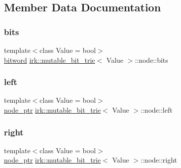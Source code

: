 \subsection{Member Data Documentation}
\mbox{\label{structirk_1_1mutable__bit__trie_1_1node_a8b55d968fa4274a91a6395ea1b9785a8}} 
\subsubsection{\texorpdfstring{bits}{bits}}
{\footnotesize\ttfamily template$<$class Value = bool$>$ \\
\mbox{\hyperlink{namespaceirk_a979e09720c2ef05573819388a3c0e79a}{bitword}} \mbox{\hyperlink{classirk_1_1mutable__bit__trie}{irk\+::mutable\+\_\+bit\+\_\+trie}}$<$ Value $>$\+::node\+::bits}

\mbox{\label{structirk_1_1mutable__bit__trie_1_1node_af59565476fb0ce3e3e3d57edbd8ca1de}} 
\subsubsection{\texorpdfstring{left}{left}}
{\footnotesize\ttfamily template$<$class Value = bool$>$ \\
\mbox{\hyperlink{classirk_1_1mutable__bit__trie_abd23179ac4f02a981d4f47b4c0652287}{node\+\_\+ptr}} \mbox{\hyperlink{classirk_1_1mutable__bit__trie}{irk\+::mutable\+\_\+bit\+\_\+trie}}$<$ Value $>$\+::node\+::left}

\mbox{\label{structirk_1_1mutable__bit__trie_1_1node_ad75512c087c6adaf342b9c62fd115f55}} 
\subsubsection{\texorpdfstring{right}{right}}
{\footnotesize\ttfamily template$<$class Value = bool$>$ \\
\mbox{\hyperlink{classirk_1_1mutable__bit__trie_abd23179ac4f02a981d4f47b4c0652287}{node\+\_\+ptr}} \mbox{\hyperlink{classirk_1_1mutable__bit__trie}{irk\+::mutable\+\_\+bit\+\_\+trie}}$<$ Value $>$\+::node\+::right}

